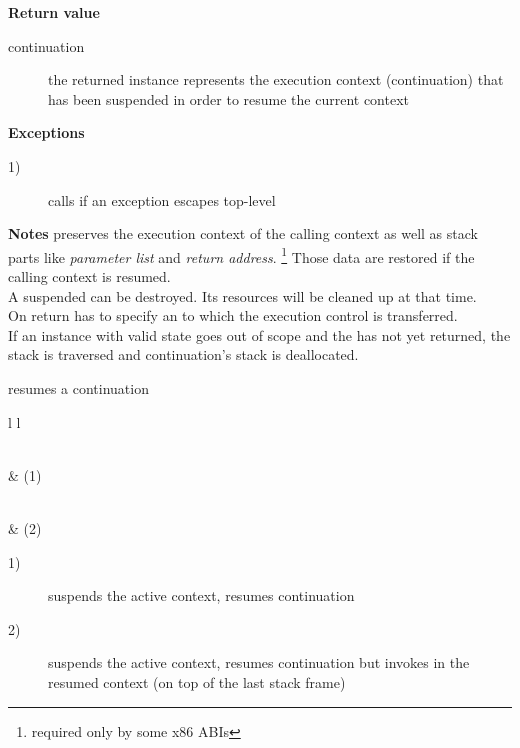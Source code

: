 {\bfseries Return value}
\begin{description}
    \item[continuation] the returned instance represents the execution context
                        (continuation) that has been suspended in order to
                        resume the current context
\end{description}

{\bfseries Exceptions}
\begin{description}
    \item[1)] calls  if an exception escapes top-level
              \\
\end{description}

{\bfseries Notes}
\newline
\call preserves the execution context of the calling context as well as stack
parts like \emph{parameter list} and \emph{return address}.
\footnote{required only by some x86 ABIs} Those data are restored if the calling
context is resumed.\\
A suspended  can be destroyed. Its resources will be cleaned
up at that time.\\
On return  has to specify an \cont to which the execution control is
transferred.\\
If an instance with valid state goes out of scope and the  has not yet
returned, the stack is traversed  and continuation's stack is deallocated.



resumes a continuation\\

\begin{tabular}{ l l }
    \midrule

    \\
     & (1)\\

    \midrule

    \\
     & (2)\\

    \midrule
\end{tabular}

\begin{description}
    \item[1)] suspends the active context, resumes continuation 
    \item[2)] suspends the active context, resumes continuation  but
              invokes  in the resumed context (on top of the
              last stack frame)
\end{description}

